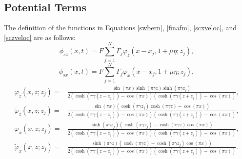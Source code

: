 \documentclass[a4paper,11pt]{article}
\begin{document}
\subsection{Potential Terms \label{poterms}}
The definition of the functions in Equations \eqref{swbern}, \eqref{finafm}, \eqref{scxveloc}, and \eqref{sczveloc}  are as follows:
\[
\phi_{sz}(x,t) =  F\sum_{j=1}^{N} \Gamma_{j}\varphi_{z}(x-x_{j},1+\mu \eta;z_{j}),
\]
\[
\phi_{sx}(x,t) = F\sum_{j=1}^{N}\Gamma_{j}\varphi_{x}(x-x_{j},1+\mu \eta;z_{j}),
\]
\begin{align*}
\varphi_{z}(x,z;z_{j}) = & \frac{\sin(\pi x)\sinh(\pi \gamma z)\sinh(\pi \gamma z_{j})}{2\left(\cosh(\pi\gamma(z-z_{j}))-\cos(\pi x)\right) \left(\cosh(\pi\gamma(z+z_{j}))-\cos(\pi x)\right)},\\
\tilde{\varphi}_{z}(x,z;z_{j}) = & \frac{\sin(\pi x)\left(\cosh(\pi \gamma z_{j})\cosh(\pi \gamma z)-\cos(\pi x)\right)}{2\left(\cosh(\pi\gamma(z-z_{j}))-\cos(\pi x)\right) \left(\cosh(\pi\gamma(z+z_{j}))-\cos(\pi x)\right)},\\
\varphi_{x}(x,z;z_{j}) = & \frac{\sinh(\pi \gamma z_{j})\left(\cosh(\pi \gamma z_{j})-\cosh(\pi \gamma z)\cos(\pi x)\right)}{2\left(\cosh(\pi\gamma(z-z_{j}))-\cos(\pi x)\right) \left(\cosh(\pi\gamma(z+z_{j}))-\cos(\pi x)\right)},\\
\tilde{\varphi}_{x}(x,z;z_{j}) = & \frac{\sinh(\pi \gamma z)(\cosh(\pi\gamma z) -\cosh(\pi \gamma z_{j})\cos(\pi x) )}{2(\cosh(\pi\gamma(z-z_{j}))-\cos(\pi x))(\cosh(\pi\gamma(z+z_{j}))-\cos(\pi x))}.
\end{align*}


\end{document}
